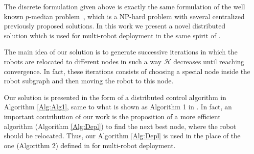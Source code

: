 \documentclass[smallcondensed]{svjour3}
\begin{document}
The discrete formulation given above is exactly the same formulation of the well known $p$-median problem~\citep{Reese2006}, which is a NP-hard problem with several centralized previously proposed solutions. 
%
In this work we present a novel distributed solution which is used for multi-robot deployment in the same spirit of \cite{Yun2013}.

The main idea of our solution is to generate successive iterations in which the robots are relocated to different nodes in such a way $\mathcal{H}$ decreases until reaching convergence. In fact, these iterations consists of choosing a special node inside the robot subgraph and then moving the robot to this node.
%

Our solution is presented in the form of a distributed control algorithm in Algorithm \ref{Alg:Alg1}, same to what is shown as Algorithm 1 in \citep{Yun2013}. In fact, an important contribution of our work is the proposition of a more efficient algorithm  (Algorithm \ref{Alg:Depl}) to find the next best node, where the robot should be relocated. Thus, our Algorithm \ref{Alg:Depl} is used in the place of the one (Algorithm 2) defined in \citep{Yun2013} for multi-robot deployment. 
\end{document}
